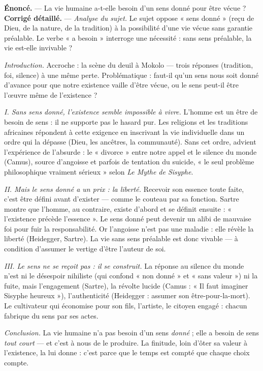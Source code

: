 \documentclass[11pt]{article}
\begin{document}
\begin{exoresolu}
\textbf{Énoncé.} — La vie humaine a-t-elle besoin d'un sens donné pour être vécue ?
\tcblower
\textbf{Corrigé détaillé.} — \emph{Analyse du sujet.} Le sujet oppose « sens donné » (reçu de Dieu, de la nature, de la tradition) à la possibilité d'une vie vécue sans garantie préalable. Le verbe « a besoin » interroge une nécessité : sans sens préalable, la vie est-elle invivable ?

\emph{Introduction.} Accroche : la scène du deuil à Mokolo — trois réponses (tradition, foi, silence) à une même perte. Problématique : faut-il qu'un sens nous soit donné d'avance pour que notre existence vaille d'être vécue, ou le sens peut-il être l'œuvre même de l'existence ?

\emph{I. Sans sens donné, l'existence semble impossible à vivre.} L'homme est un être de besoin de sens : il ne supporte pas le hasard pur. Les religions et les traditions africaines répondent à cette exigence en inscrivant la vie individuelle dans un ordre qui la dépasse (Dieu, les ancêtres, la communauté). Sans cet ordre, advient l'expérience de l'absurde : le « divorce » entre notre appel et le silence du monde (Camus), source d'angoisse et parfois de tentation du suicide, « le seul problème philosophique vraiment sérieux » selon \emph{Le Mythe de Sisyphe}.

\emph{II. Mais le sens donné a un prix : la liberté.} Recevoir son essence toute faite, c'est être défini avant d'exister — comme le couteau par sa fonction. Sartre montre que l'homme, au contraire, existe d'abord et se définit ensuite : « l'existence précède l'essence ». Le sens donné peut devenir un alibi de mauvaise foi pour fuir la responsabilité. Or l'angoisse n'est pas une maladie : elle révèle la liberté (Heidegger, Sartre). La vie sans sens préalable est donc vivable — à condition d'assumer le vertige d'être l'auteur de soi.

\emph{III. Le sens ne se reçoit pas : il se construit.} La réponse au silence du monde n'est ni le désespoir nihiliste (qui confond « non donné » et « sans valeur ») ni la fuite, mais l'engagement (Sartre), la révolte lucide (Camus : « Il faut imaginer Sisyphe heureux »), l'authenticité (Heidegger : assumer son être-pour-la-mort). Le cultivateur qui économise pour son fils, l'artiste, le citoyen engagé : chacun fabrique du sens par ses actes.

\emph{Conclusion.} La vie humaine n'a pas besoin d'un sens \emph{donné} ; elle a besoin de sens \emph{tout court} — et c'est à nous de le produire. La finitude, loin d'ôter sa valeur à l'existence, la lui donne : c'est parce que le temps est compté que chaque choix compte.
\end{exoresolu}
\end{document}
